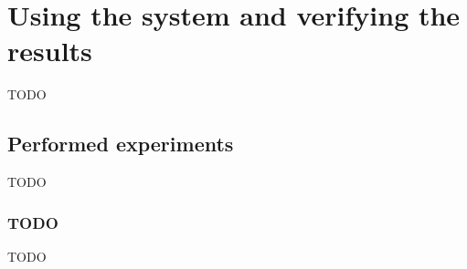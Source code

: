 
\chapter{Using the system and verifying the results}
\label{ch:using_system}
TODO

\section{Performed experiments}
\label{sec:performed_experiments}
TODO


\subsection{TODO}
\label{subsec:performed_experiments_XXX}
TODO

